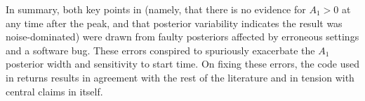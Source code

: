 \documentclass[aps,prd,twocolumn,superscriptaddress,preprintnumbers,floatfix,nofootinbib]{revtex4-2}
\begin{document}

In summary, both key points in \cite{Cotesta:2022pci} (namely, that there is no evidence for $A_1 > 0$ at any time after the peak, and that posterior variability indicates the result was noise-dominated) were drawn from faulty posteriors affected by erroneous settings and a software bug.
These errors conspired to spuriously exacerbate the $A_1$ posterior width and sensitivity to start time.
On fixing these errors, the code used in \cite{Cotesta:2022pci} returns results in agreement with the rest of the literature and in tension with central claims in \cite{Cotesta:2022pci} itself.


\end{document}
